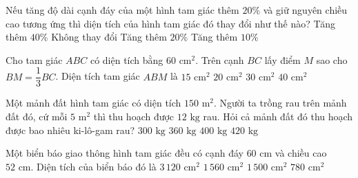 \begin{ex} %
Nếu tăng độ dài cạnh đáy của một hình tam giác thêm $20\%$ và giữ nguyên chiều cao tương ứng thì diện tích của hình tam giác đó thay đổi như thế nào?
\choice
{Tăng thêm $40\%$}
{Không thay đổi}
{\True Tăng thêm $20\%$}
{Tăng thêm $10\%$}
\end{ex}

\begin{ex} %
Cho tam giác $ABC$ có diện tích bằng $60\text{ cm}^2$. Trên cạnh $BC$ lấy điểm $M$ sao cho $BM = \dfrac{1}{3} BC$. Diện tích tam giác $ABM$ là
\choice
{$15\text{ cm}^2$}
{\True $20\text{ cm}^2$}
{$30\text{ cm}^2$}
{$40\text{ cm}^2$}
\end{ex}

\begin{ex} %
Một mảnh đất hình tam giác có diện tích $150\text{ m}^2$. Người ta trồng rau trên mảnh đất đó, cứ mỗi $5\text{ m}^2$ thì thu hoạch được $12\text{ kg}$ rau. Hỏi cả mảnh đất đó thu hoạch được bao nhiêu ki-lô-gam rau?
\choice
{$300\text{ kg}$}
{\True $360\text{ kg}$}
{$400\text{ kg}$}
{$420\text{ kg}$}
\end{ex}

\begin{ex} %
Một biển báo giao thông hình tam giác đều có cạnh đáy $60\text{ cm}$ và chiều cao $52\text{ cm}$. Diện tích của biển báo đó là
\choice
{$3\,120\text{ cm}^2$}
{\True $1\,560\text{ cm}^2$}
{$1\,500\text{ cm}^2$}
{$780\text{ cm}^2$}
\end{ex}

